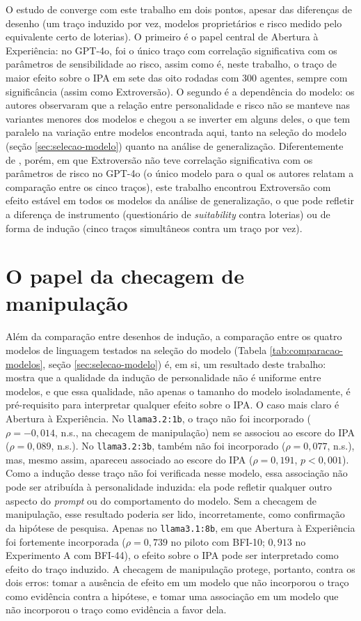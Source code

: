 O estudo de  converge com este trabalho em dois
pontos, apesar das diferenças de desenho (um traço induzido por vez,
modelos proprietários e risco medido pelo equivalente certo de
loterias). O primeiro é o papel central de Abertura à Experiência: no
GPT-4o, foi o único traço com correlação significativa com os parâmetros
de sensibilidade ao risco, assim como é, neste trabalho, o traço de maior
efeito sobre o IPA em sete das oito rodadas com 300 agentes, sempre com
significância (assim como Extroversão). O segundo é a dependência do modelo:
os autores observaram que a relação entre personalidade e risco não se
manteve nas variantes menores dos modelos e chegou a se inverter em
alguns deles, o que tem paralelo na variação entre modelos encontrada
aqui, tanto na seleção do modelo (seção \ref{sec:selecao-modelo}) quanto
na análise de generalização. Diferentemente de ,
porém, em que Extroversão não teve correlação significativa com os
parâmetros de risco no GPT-4o (o único modelo para o qual os autores
relatam a comparação entre os cinco traços), este trabalho encontrou Extroversão com efeito estável
em todos os modelos da análise de generalização, o que pode refletir a
diferença de instrumento (questionário de \textit{suitability} contra
loterias) ou de forma de indução (cinco traços simultâneos contra um
traço por vez).

\section{O papel da checagem de manipulação}

Além da comparação entre desenhos de indução, a comparação entre os
quatro modelos de linguagem testados na seleção do modelo (Tabela
\ref{tab:comparacao-modelos}, seção \ref{sec:selecao-modelo}) é, em si,
um resultado deste trabalho: mostra que a qualidade da indução de
personalidade não é uniforme entre modelos, e que essa qualidade, não
apenas o tamanho do modelo isoladamente, é pré-requisito para
interpretar qualquer efeito sobre o IPA. O caso mais claro é Abertura à
Experiência. No \texttt{llama3.2:1b}, o traço não foi incorporado
($\rho=-0{,}014$, n.s., na checagem de manipulação) nem se associou ao
escore do IPA ($\rho=0{,}089$, n.s.). No \texttt{llama3.2:3b}, também não
foi incorporado ($\rho=0{,}077$, n.s.), mas, mesmo assim, apareceu
associado ao escore do IPA ($\rho=0{,}191$, $p<0{,}001$). Como a indução
desse traço não foi verificada nesse modelo, essa associação não pode
ser atribuída à personalidade induzida: ela pode refletir qualquer outro
aspecto do \textit{prompt} ou do comportamento do modelo. Sem a checagem
de manipulação, esse resultado poderia ser lido, incorretamente, como
confirmação da hipótese de pesquisa. Apenas no \texttt{llama3.1:8b}, em
que Abertura à Experiência foi fortemente incorporada ($\rho=0{,}739$ no
piloto com BFI-10; $0{,}913$ no Experimento A com BFI-44), o efeito sobre
o IPA pode ser interpretado como efeito do traço induzido. A checagem de
manipulação protege, portanto, contra os dois erros: tomar a ausência de
efeito em um modelo que não incorporou o traço como evidência contra a
hipótese, e tomar uma associação em um modelo que não incorporou o traço
como evidência a favor dela.

